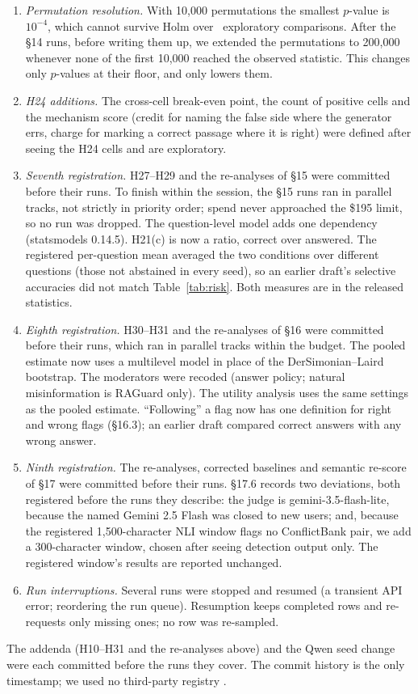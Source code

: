 \begin{enumerate}[leftmargin=*,itemsep=1pt,topsep=2pt]
ran at its default, and as a detector its JSON goes to the regex fallback. The answer
parser unwraps paired tags (\texttt{<answer>X</answer>}), a format no earlier result contained.
\item \emph{Permutation resolution.} With 10,000 permutations the smallest $p$-value is $10^{-4}$, which cannot
survive Holm over \nExploratory\ exploratory comparisons. After the \S14 runs, before writing them up, we
extended the permutations to 200,000 whenever none of the first 10,000 reached the observed statistic. This changes
only $p$-values at their floor, and only lowers them.
\item \emph{H24 additions.} The cross-cell break-even point, the count of positive cells and the mechanism score
(credit for naming the false side where the generator errs, charge for marking a correct passage where it is right)
were defined after seeing the H24 cells and are exploratory.
\item \emph{Seventh registration.} H27--H29 and the re-analyses of \S15 were committed before their runs. To finish
within the session, the \S15 runs ran in parallel tracks, not strictly in priority order; spend never
approached the \$195 limit, so no run was dropped. The question-level model adds one dependency (statsmodels 0.14.5).
H21(c) is now a ratio, correct over answered. The registered per-question mean averaged the two conditions
over different questions (those not abstained in every seed), so an earlier draft's selective accuracies did
not match Table~\ref{tab:risk}. Both measures are in the released statistics.
\item \emph{Eighth registration.} H30--H31 and the re-analyses of \S16 were committed before their runs, which
ran in parallel tracks within the budget. The pooled estimate now uses a multilevel model in place of the
DerSimonian--Laird bootstrap. The moderators were recoded (answer policy; natural misinformation is RAGuard only).
The utility analysis uses the same settings as the pooled estimate. ``Following'' a flag now has one definition for
right and wrong flags (\S16.3); an earlier draft compared correct answers with any wrong answer.
\item \emph{Ninth registration.} The re-analyses, corrected baselines and semantic re-score of \S17 were committed
before their runs. \S17.6 records two deviations, both registered before the runs they describe: the judge is
gemini-3.5-flash-lite, because the named Gemini 2.5 Flash was closed to new users; and, because the registered
1,500-character NLI window flags no ConflictBank pair, we add a 300-character window, chosen after seeing
detection output only. The registered window's results are reported unchanged.
\item \emph{Run interruptions.} Several runs were stopped and resumed (a transient API error; reordering the run
queue). Resumption keeps completed rows and re-requests only missing ones; no row was re-sampled.
\end{enumerate}
The addenda (H10--H31 and the re-analyses above) and the Qwen seed change were each committed before
the runs they cover. The commit history is the only timestamp; we used no third-party registry
\citep{vanmiltenburg2021preregistering}.

